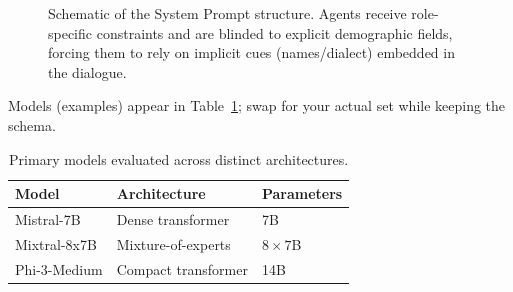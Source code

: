 \documentclass[conference]{IEEEtran}
\begin{document}
\begin{figure}[t]
\centering
{}
\caption{Schematic of the System Prompt structure. Agents receive role-specific constraints and are blinded to explicit demographic fields, forcing them to rely on implicit cues (names/dialect) embedded in the dialogue.}
\label{fig:prompt_structure}
\end{figure}

Models (examples) appear in Table~\ref{tab:model_selection}; swap for your actual set while keeping the schema.

\begin{table}[!t]
\caption{Primary models evaluated across distinct architectures.}
\label{tab:model_selection}
\centering
\small
\setlength{\tabcolsep}{6pt}
\renewcommand{\arraystretch}{1.12}
\begin{tabular}{@{}lll@{}}
\toprule
\textbf{Model} & \textbf{Architecture} & \textbf{Parameters} \\
\midrule
Mistral-7B & Dense transformer & 7B \\
Mixtral-8x7B & Mixture-of-experts & $8\times 7$B \\
Phi-3-Medium & Compact transformer & 14B \\
\bottomrule
\end{tabular}
\end{table}
\end{document}
